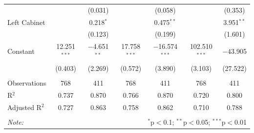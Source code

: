 \documentclass[
  12pt,
]{article}
\begin{document}
\begin{table}[!htbp]
\begin{tabular}{@{\extracolsep{5pt}}lcccccc}
  &  & (0.031) &  & (0.058) &  & (0.353) \\ 
  Left Cabinet &  & 0.218$^{*}$ &  & 0.475$^{**}$ &  & 3.951$^{**}$ \\ 
  &  & (0.123) &  & (0.199) &  & (1.601) \\ 
  Constant & 12.251$^{***}$ & $-$4.651$^{**}$ & 17.758$^{***}$ & $-$16.574$^{***}$ & 102.510$^{***}$ & $-$43.905 \\ 
  & (0.403) & (2.269) & (0.572) & (3.890) & (3.103) & (27.522) \\ 
 \hline \\[-1.8ex] 
Observations & 768 & 411 & 768 & 411 & 768 & 411 \\ 
R$^{2}$ & 0.737 & 0.870 & 0.766 & 0.870 & 0.720 & 0.800 \\ 
Adjusted R$^{2}$ & 0.727 & 0.863 & 0.758 & 0.862 & 0.710 & 0.788 \\ 
\hline 
\hline \\[-1.8ex] 
\textit{Note:}  & \multicolumn{6}{r}{$^{*}$p$<$0.1; $^{**}$p$<$0.05; $^{***}$p$<$0.01} \\ 
\end{tabular} 
\end{table}
\end{document}
